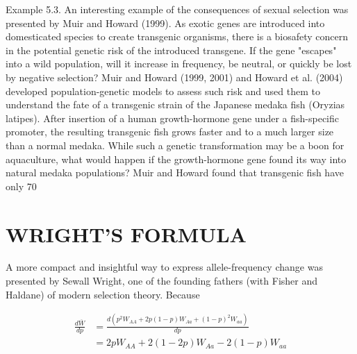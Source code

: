 \documentclass{article}
\begin{document}
Example 5.3. An interesting example of the consequences of sexual selection was presented by Muir and Howard (1999). As exotic genes are introduced into domesticated species to create transgenic organisms, there is a biosafety concern in the potential genetic risk of the introduced transgene. If the gene "escapes" into a wild population, will it increase in frequency, be neutral, or quickly be lost by negative selection? Muir and Howard (1999, 2001) and Howard et al. (2004) developed population-genetic models to assess such risk and used them to understand the fate of a transgenic strain of the Japanese medaka fish (Oryzias latipes). After insertion of a human growth-hormone gene under a fish-specific promoter, the resulting transgenic fish grows faster and to a much larger size than a normal medaka. While such a genetic transformation may be a boon for aquaculture, what would happen if the growth-hormone gene found its way into natural medaka populations? Muir and Howard found that transgenic fish have only 70%

\section{WRIGHT'S FORMULA}
A more compact and insightful way to express allele-frequency change was presented by Sewall Wright, one of the founding fathers (with Fisher and Haldane) of modern selection theory. Because

\begin{equation}
\begin{aligned}\frac{d\overline{W}}{dp}&=\frac{d\left(p^{2}W_{AA}+2p(1-p)W_{Aa}+(1-p)^{2}W_{aa}\right)}{dp}\\&=2pW_{AA}+2(1-2p)W_{Aa}-2(1-p)W_{aa}\end{aligned}
\tag{5.5a}
\label{eq:5_5a}
\end{equation}
\end{document}
